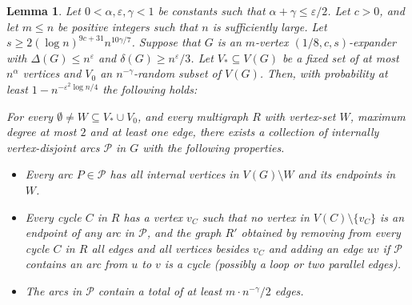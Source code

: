 \documentclass[11pt,reqno]{article}
\newtheorem{lemma}[theorem]{Lemma}
\begin{document}
\begin{lemma}\label{lem: expander connections}
    Let $0<\alpha,\varepsilon,\gamma<1$ be constants such that $\alpha +\gamma\leq\varepsilon/2$. Let $c>0$, and let $m\le n$ be positive integers such that $n$ is sufficiently large. Let $s\ge 2 (\log n)^{9c+31}n^{10\gamma/7}$. Suppose that $G$ is an $m$-vertex $(1/8, c, s)$-expander with $\Delta(G)\leq n^{\varepsilon}$ and $\delta(G)\geq n^{\varepsilon}/3$. Let $V_*\subseteq V(G)$ be a fixed set of at most $n^{\alpha}$ vertices and $V_0$ an $n^{-\gamma}$-random subset of $V(G)$. Then, with probability at least $1-n^{-\varepsilon^2\log n/4}$ the following holds: 

    \noindent For every $\emptyset \neq W\subseteq V_*\cup V_0$, and every multigraph $R$ with vertex-set $W$, maximum degree at most $2$ and at least one edge, there exists a collection of internally vertex-disjoint arcs $\mathcal P$ in $G$ with the following properties.
    \begin{itemize}
        \item Every arc $P\in \mathcal P$ has all internal vertices in $V(G)\setminus W$ and its endpoints in $W$.
        \item Every cycle $C$ in $R$ has a vertex $v_C$ such that no vertex in $V(C)\setminus \{v_C\}$ is an endpoint of any arc in $\mathcal P$, and the graph $R'$ obtained by removing from every cycle $C$ in $R$ all edges and all vertices besides $v_C$ and adding an edge $uv$ if $\mathcal P$ contains an arc from $u$ to $v$ is a cycle (possibly a loop or two parallel edges). 
        \item The arcs in $\mathcal P$ contain a total of at least $m\cdot n^{-\gamma}/2$ edges.
    \end{itemize}
\end{lemma}
\end{document}
